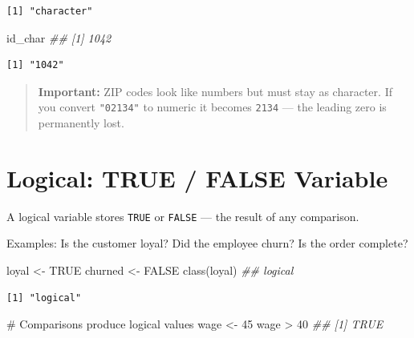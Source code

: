 \documentclass[
  letterpaper,
  DIV=11,
  numbers=noendperiod]{scrreprt}
\newenvironment{Shaded}{\begin{snugshade}}{\end{snugshade}}
\newcommand{\CommentTok}[1]{\textcolor[rgb]{0.37,0.37,0.37}{#1}}
\newcommand{\ConstantTok}[1]{\textcolor[rgb]{0.56,0.35,0.01}{#1}}
\newcommand{\DecValTok}[1]{\textcolor[rgb]{0.68,0.00,0.00}{#1}}
\newcommand{\DocumentationTok}[1]{\textcolor[rgb]{0.37,0.37,0.37}{\textit{#1}}}
\newcommand{\FunctionTok}[1]{\textcolor[rgb]{0.28,0.35,0.67}{#1}}
\newcommand{\NormalTok}[1]{\textcolor[rgb]{0.00,0.23,0.31}{#1}}
\newcommand{\OtherTok}[1]{\textcolor[rgb]{0.00,0.23,0.31}{#1}}
\newcommand{\SpecialCharTok}[1]{\textcolor[rgb]{0.37,0.37,0.37}{#1}}
\begin{document}
\begin{verbatim}
[1] "character"
\end{verbatim}

\begin{Shaded}
\begin{Highlighting}[]
\NormalTok{id\_char  }\DocumentationTok{\#\# [1] \textquotesingle{}1042\textquotesingle{}}
\end{Highlighting}
\end{Shaded}

\begin{verbatim}
[1] "1042"
\end{verbatim}

\begin{quote}
\textbf{Important:} ZIP codes look like numbers but must stay as
character. If you convert \texttt{"02134"} to numeric it becomes
\texttt{2134} --- the leading zero is permanently lost.
\end{quote}

\section{Logical: TRUE / FALSE
Variable}\label{logical-true-false-variable}

A logical variable stores \texttt{TRUE} or \texttt{FALSE} --- the result
of any comparison.

Examples: Is the customer loyal? Did the employee churn? Is the order
complete?

\begin{Shaded}
\begin{Highlighting}[]
\NormalTok{loyal }\OtherTok{\textless{}{-}} \ConstantTok{TRUE}
\NormalTok{churned }\OtherTok{\textless{}{-}} \ConstantTok{FALSE}
\FunctionTok{class}\NormalTok{(loyal)  }\DocumentationTok{\#\# \textquotesingle{}logical\textquotesingle{}}
\end{Highlighting}
\end{Shaded}

\begin{verbatim}
[1] "logical"
\end{verbatim}

\begin{Shaded}
\begin{Highlighting}[]
\CommentTok{\# Comparisons produce logical values}
\NormalTok{wage }\OtherTok{\textless{}{-}} \DecValTok{45}
\NormalTok{wage }\SpecialCharTok{\textgreater{}} \DecValTok{40}  \DocumentationTok{\#\# [1] TRUE}
\end{Highlighting}
\end{Shaded}
\end{document}
